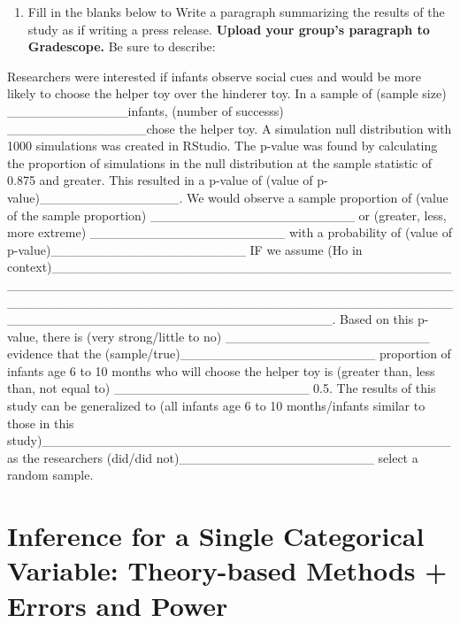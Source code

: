 \documentclass[
]{report}
\providecommand{\tightlist}{%
  \setlength{\itemsep}{0pt}\setlength{\parskip}{0pt}}
\begin{document}
\vspace{1in}


\begin{enumerate}
\def\labelenumi{\arabic{enumi}.}
\setcounter{enumi}{14}
\tightlist
\item
  Fill in the blanks below to Write a paragraph summarizing the results of the study as if writing a press release. \textbf{Upload your group's paragraph to Gradescope.} Be sure to describe:
\end{enumerate}

Researchers were interested if infants observe social cues and would be more likely to choose the helper toy over the hinderer toy. In a sample of (sample size) \_\_\_\_\_\_\_\_\_\_\_\_\_infants, (number of successs) \_\_\_\_\_\_\_\_\_\_\_\_\_\_\_chose the helper toy. A simulation null distribution with 1000 simulations was created in RStudio. The p-value was found by calculating the proportion of simulations in the null distribution at the sample statistic of 0.875 and greater. This resulted in a p-value of (value of p-value)\_\_\_\_\_\_\_\_\_\_\_\_\_\_\_. We would observe a sample proportion of (value of the sample proportion) \_\_\_\_\_\_\_\_\_\_\_\_\_\_\_\_\_\_\_\_\_\_ or (greater, less, more extreme) \_\_\_\_\_\_\_\_\_\_\_\_\_\_\_\_\_\_\_\_\_ with a probability of (value of p-value)\_\_\_\_\_\_\_\_\_\_\_\_\_\_\_\_\_\_\_\_\_ IF we assume (Ho in context)\_\_\_\_\_\_\_\_\_\_\_\_\_\_\_\_\_\_\_\_\_\_\_\_\_\_\_\_\_\_\_\_\_\_\_\_\_\_\_\_\_\_\_\_\_\_\_\_\_\_\_\_\_\_\_\_\_\_\_\_\_\_\_\_\_\_\_\_\_\_\_\_\_\_\_\_\_\_\_\_\_\_\_\_\_\_\_\_\_\_\_\_\_\_\_\_\_\_\_\_\_\_\_\_\_\_\_\_\_\_\_\_\_\_\_\_\_\_\_\_\_\_\_\_\_\_\_\_\_\_\_\_\_\_\_\_\_\_\_\_\_\_\_\_\_\_\_\_\_\_\_\_\_\_\_\_\_\_\_\_\_\_\_\_\_\_\_\_\_\_\_\_\_\_.
Based on this p-value, there is (very strong/little to no) \_\_\_\_\_\_\_\_\_\_\_\_\_\_\_\_\_\_\_\_\_\_ evidence that the (sample/true)\_\_\_\_\_\_\_\_\_\_\_\_\_\_\_\_\_\_\_\_\_ proportion of infants age 6 to 10 months who will choose the helper toy is (greater than, less than, not equal to) \_\_\_\_\_\_\_\_\_\_\_\_\_\_\_\_\_\_\_\_\_ 0.5. The results of this study can be generalized to (all infants age 6 to 10 months/infants similar to those in this study)\_\_\_\_\_\_\_\_\_\_\_\_\_\_\_\_\_\_\_\_\_\_\_\_\_\_\_\_\_\_\_\_\_\_\_\_\_\_\_\_\_\_\_\_ as the researchers (did/did not)\_\_\_\_\_\_\_\_\_\_\_\_\_\_\_\_\_\_\_\_\_ select a random sample.

\newpage

\hypertarget{inference-for-a-single-categorical-variable-theory-based-methods-errors-and-power}{%
\chapter{Inference for a Single Categorical Variable: Theory-based Methods + Errors and Power}\label{inference-for-a-single-categorical-variable-theory-based-methods-errors-and-power}}
\end{document}
